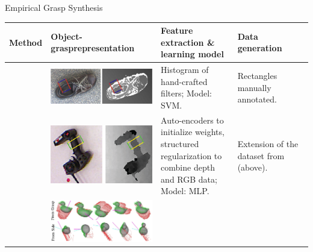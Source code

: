 \documentclass{beamer}
\begin{document}
\begin{frame}{Empirical Grasp Synthesis}
    \begin{table}[!t]
        \tiny
        \def\arraystretch{1.2}
        \begin{tabularx}{\linewidth}{L{0.05\linewidth}C{0.39\linewidth}L{0.28\linewidth}L{0.28\linewidth}}
            Method & Object-grasp\linebreak representation & Feature extraction \& learning model & Data generation \\
            \toprule
            \cite{jiang2011}    & \includegraphics[scale=0.09,valign=t]{jiang_et_al-2011-grasp_representation}
                                & Histogram of hand-crafted filters; \linebreak Model: SVM.
                                & Rectangles manually \linebreak annotated. \\
            \cite{lenz2015}     & \includegraphics[scale=0.16,valign=t]{lenz_et_al-2015-grasp_representation}
                                & Auto-encoders to initialize weights, structured regularization to combine depth
                                  and RGB data; \linebreak Model: MLP.
                                & Extension of the \linebreak dataset from \cite{jiang2011} \linebreak (above).\\
            \cite{Kappler2015}  &
                        \includegraphics[scale=0.16,valign=t]{kappler_et_al-2015-fig8-local_shape_diff_viewpoints}

\end{tabularx}
\end{table}
\end{frame}
\end{document}
